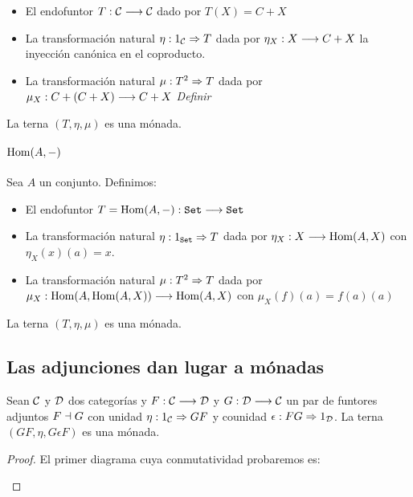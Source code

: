 \begin{itemize}
\item El endofuntor $T: \mathcal{C}\longrightarrow \mathcal{C}$ dado por $T(X) = C + X$
\item La transformación natural $\eta : 1_{\mathcal{C}}\Rightarrow T$ dada por
  $\eta_X : X\longrightarrow C+X$ la inyección canónica en el coproducto.
\item La transformación natural $\mu: T^2\Rightarrow T$ dada por
  $\mu_X : C + (C + X)\longrightarrow C + X$ \textit{Definir}
\end{itemize}

La terna $(T, \eta, \mu)$ es una mónada.


\paragraph{$\operatorname{Hom}(A, -)$}
Sea $A$ un conjunto. Definimos:

\begin{itemize}
\item El endofuntor $T = \operatorname{Hom}(A, -) : \texttt{Set}\longrightarrow \texttt{Set}$
\item La transformación natural $\eta : 1_{\texttt{Set}}\Rightarrow T$ dada
  por $\eta_X : X\longrightarrow \operatorname{Hom}(A, X)$ con $\eta_X(x)(a) = x$.
\item La transformación natural $\mu: T^2\Rightarrow T$ dada por
  $\mu_X : \operatorname{Hom}(A, \operatorname{Hom}(A, X))\longrightarrow \operatorname{Hom}(A, X)$ con
  $\mu_X(f)(a) = f(a)(a)$
\end{itemize}

La terna $(T, \eta, \mu)$ es una mónada.

\subsection{Las adjunciones dan lugar a mónadas}
\begin{theorem}
Sean $\mathcal{C}$ y $\mathcal{D}$ dos categorías y $F : \mathcal{C}\longrightarrow \mathcal{D}$ y $G: \mathcal{D}\longrightarrow \mathcal{C}$ un
par de funtores adjuntos $F \dashv G$ con unidad
$\eta : 1_{\mathcal{C}}\Rightarrow GF$ y counidad $\epsilon: FG\Rightarrow 1_{\mathcal{D}}$. La terna
$(GF, \eta, G\epsilon F)$ es una mónada.
\end{theorem}
\begin{proof}
  El primer diagrama cuya conmutatividad probaremos es:

  \begin{center}
  \end{center}
\end{proof}


